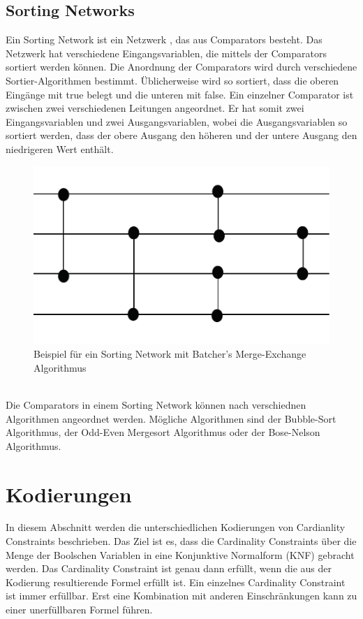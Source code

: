 \documentclass[a4,abstract=on]{scrartcl}
\newcommand*\stdsection{}
\let\stdsection\section
\renewcommand*\section{%
    \clearpage\ifodd\value{page}\else\mbox{}\clearpage\fi
    \stdsection}
\begin{document}
\subsection{Sorting Networks}
Ein Sorting Network ist ein Netzwerk \cite[vgl.][]{sorting}, das aus Comparators besteht. Das Netzwerk hat verschiedene Eingangsvariablen, die mittels der Comparators sortiert werden können. Die Anordnung der Comparators wird durch verschiedene Sortier-Algorithmen bestimmt. Üblicherweise wird so sortiert, dass die oberen Eingänge mit true belegt und die unteren mit false. Ein einzelner Comparator ist zwischen zwei verschiedenen Leitungen angeordnet. Er hat somit zwei Eingangsvariablen und zwei Ausgangsvariablen, wobei die Ausgangsvariablen so sortiert werden, dass der obere Ausgang den höheren und der untere Ausgang den niedrigeren Wert enthält.

\begin{figure}[H]
\centering
\includegraphics[width=\textwidth]{sorting_network_grundlage1.pdf}
\caption{Beispiel für ein Sorting Network mit Batcher's Merge-Exchange Algorithmus}
\label{fig:network_grundlage}
\end{figure}
\ \\
Die Comparators in einem Sorting Network können nach verschiednen Algorithmen angeordnet werden. Mögliche Algorithmen sind der Bubble-Sort Algorithmus, der Odd-Even Mergesort Algorithmus oder der Bose-Nelson Algorithmus.

\section{Kodierungen}
In diesem Abschnitt werden die unterschiedlichen Kodierungen von Cardianlity Constraints beschrieben. Das Ziel ist es, dass die Cardinality Constraints über die Menge der Boolschen Variablen in eine Konjunktive Normalform (KNF) gebracht werden. %
Das Cardinality Constraint ist genau dann erfüllt, wenn die aus der Kodierung resultierende Formel erfüllt ist. Ein einzelnes Cardinality Constraint ist immer erfüllbar. Erst eine Kombination mit anderen Einschränkungen kann zu einer unerfüllbaren Formel führen.
\end{document}
